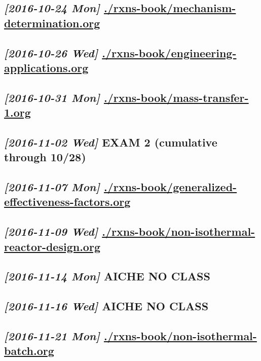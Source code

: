 \documentclass[11pt]{article}
\begin{document}
\subsection{\textit{[2016-10-24 Mon] } \url{./rxns-book/mechanism-determination.org}}
\label{sec:orgheadline33}

\subsection{\textit{[2016-10-26 Wed] } \url{./rxns-book/engineering-applications.org}}
\label{sec:orgheadline34}

\subsection{\textit{[2016-10-31 Mon] } \url{./rxns-book/mass-transfer-1.org}}
\label{sec:orgheadline35}

\subsection{\textit{[2016-11-02 Wed] } EXAM 2 (cumulative through 10/28)}
\label{sec:orgheadline36}

\subsection{\textit{[2016-11-07 Mon] } \url{./rxns-book/generalized-effectiveness-factors.org}}
\label{sec:orgheadline37}

\subsection{\textit{[2016-11-09 Wed] } \url{./rxns-book/non-isothermal-reactor-design.org}}
\label{sec:orgheadline38}

\subsection{\textit{[2016-11-14 Mon] } \textbf{AICHE NO CLASS}}
\label{sec:orgheadline39}

\subsection{\textit{[2016-11-16 Wed] } \textbf{AICHE NO CLASS}}
\label{sec:orgheadline40}

\subsection{\textit{[2016-11-21 Mon] } \url{./rxns-book/non-isothermal-batch.org}}
\label{sec:orgheadline41}
\end{document}
